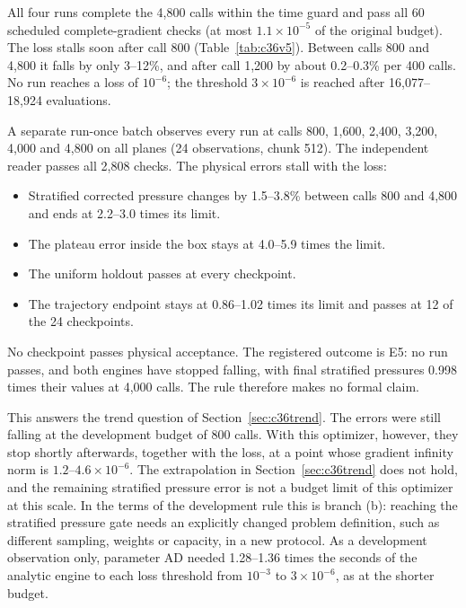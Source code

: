 \documentclass[11pt]{article}
\begin{document}
All four runs complete the 4,800 calls within the time guard and pass all 60
scheduled complete-gradient checks (at most $1.1\times10^{-5}$ of the
original budget). The loss stalls soon after call 800
(Table~\ref{tab:c36v5}). Between calls 800 and 4,800 it falls by only
3--12\%, and after call 1,200 by about 0.2--0.3\% per 400 calls. No run
reaches a loss of $10^{-6}$; the threshold $3\times10^{-6}$ is reached after
16,077--18,924 evaluations.

A separate run-once batch observes every run at calls 800, 1,600, 2,400,
3,200, 4,000 and 4,800 on all planes (24 observations, chunk 512). The
independent reader passes all 2,808 checks. The physical errors stall with
the loss:
\begin{itemize}
\item Stratified corrected pressure changes by 1.5--3.8\% between calls 800
  and 4,800 and ends at 2.2--3.0 times its limit.
\item The plateau error inside the box stays at 4.0--5.9 times the limit.
\item The uniform holdout passes at every checkpoint.
\item The trajectory endpoint stays at 0.86--1.02 times its limit and passes
  at 12 of the 24 checkpoints.
\end{itemize}
No checkpoint passes physical acceptance. The registered outcome is E5: no
run passes, and both engines have stopped falling, with final stratified
pressures 0.998 times their values at 4,000 calls. The rule therefore makes
no formal claim.

This answers the trend question of Section~\ref{sec:c36trend}. The errors
were still falling at the development budget of 800 calls. With this
optimizer, however, they stop shortly afterwards, together with the loss,
at a point whose gradient infinity norm is $1.2$--$4.6\times10^{-6}$. The
extrapolation in Section~\ref{sec:c36trend} does not hold, and the remaining
stratified pressure error is not a budget limit of this optimizer at this
scale. In the terms of the development rule this is branch (b): reaching the
stratified pressure gate needs an explicitly changed problem definition,
such as different sampling, weights or capacity, in a new protocol. As a
development observation only, parameter AD needed 1.28--1.36 times the
seconds of the analytic engine to each loss threshold from $10^{-3}$ to
$3\times10^{-6}$, as at the shorter budget.
\end{document}
